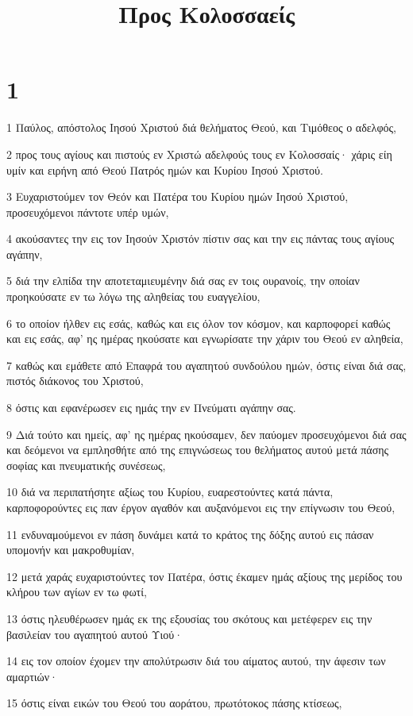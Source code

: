 

\title{Προς Κολοσσαείς}


\chapter{1}

\par 1 Παύλος, απόστολος Ιησού Χριστού διά θελήματος Θεού, και Τιμόθεος ο αδελφός,
\par 2 προς τους αγίους και πιστούς εν Χριστώ αδελφούς τους εν Κολοσσαίς· χάρις είη υμίν και ειρήνη από Θεού Πατρός ημών και Κυρίου Ιησού Χριστού.
\par 3 Ευχαριστούμεν τον Θεόν και Πατέρα του Κυρίου ημών Ιησού Χριστού, προσευχόμενοι πάντοτε υπέρ υμών,
\par 4 ακούσαντες την εις τον Ιησούν Χριστόν πίστιν σας και την εις πάντας τους αγίους αγάπην,
\par 5 διά την ελπίδα την αποτεταμιευμένην διά σας εν τοις ουρανοίς, την οποίαν προηκούσατε εν τω λόγω της αληθείας του ευαγγελίου,
\par 6 το οποίον ήλθεν εις εσάς, καθώς και εις όλον τον κόσμον, και καρποφορεί καθώς και εις εσάς, αφ' ης ημέρας ηκούσατε και εγνωρίσατε την χάριν του Θεού εν αληθεία,
\par 7 καθώς και εμάθετε από Επαφρά του αγαπητού συνδούλου ημών, όστις είναι διά σας, πιστός διάκονος του Χριστού,
\par 8 όστις και εφανέρωσεν εις ημάς την εν Πνεύματι αγάπην σας.
\par 9 Διά τούτο και ημείς, αφ' ης ημέρας ηκούσαμεν, δεν παύομεν προσευχόμενοι διά σας και δεόμενοι να εμπλησθήτε από της επιγνώσεως του θελήματος αυτού μετά πάσης σοφίας και πνευματικής συνέσεως,
\par 10 διά να περιπατήσητε αξίως του Κυρίου, ευαρεστούντες κατά πάντα, καρποφορούντες εις παν έργον αγαθόν και αυξανόμενοι εις την επίγνωσιν του Θεού,
\par 11 ενδυναμούμενοι εν πάση δυνάμει κατά το κράτος της δόξης αυτού εις πάσαν υπομονήν και μακροθυμίαν,
\par 12 μετά χαράς ευχαριστούντες τον Πατέρα, όστις έκαμεν ημάς αξίους της μερίδος του κλήρου των αγίων εν τω φωτί,
\par 13 όστις ηλευθέρωσεν ημάς εκ της εξουσίας του σκότους και μετέφερεν εις την βασιλείαν του αγαπητού αυτού Υιού·
\par 14 εις τον οποίον έχομεν την απολύτρωσιν διά του αίματος αυτού, την άφεσιν των αμαρτιών·
\par 15 όστις είναι εικών του Θεού του αοράτου, πρωτότοκος πάσης κτίσεως,
